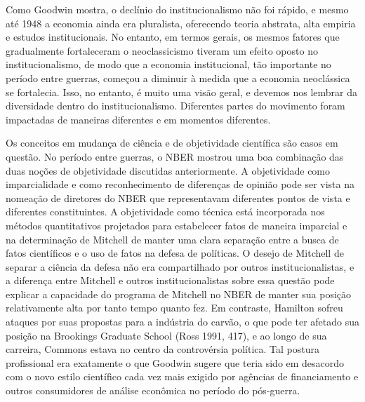 \documentclass[12pt]{article}
\begin{document}
Como Goodwin mostra, o declínio do institucionalismo não foi rápido, e mesmo até 1948 a economia ainda era pluralista, oferecendo teoria abstrata, alta empiria e estudos institucionais. No entanto, em termos gerais, os mesmos fatores que gradualmente fortaleceram o neoclassicismo tiveram um efeito oposto no institucionalismo, de modo que a economia institucional, tão importante no período entre guerras, começou a diminuir à medida que a economia neoclássica se fortalecia. Isso, no entanto, é muito uma visão geral, e devemos nos lembrar da diversidade dentro do institucionalismo. Diferentes partes do movimento foram impactadas de maneiras diferentes e em momentos diferentes.

Os conceitos em mudança de ciência e de objetividade científica são casos em questão. No período entre guerras, o NBER mostrou uma boa combinação das duas noções de objetividade discutidas anteriormente. A objetividade como imparcialidade e como reconhecimento de diferenças de opinião pode ser vista na nomeação de diretores do NBER que representavam diferentes pontos de vista e diferentes constituintes. A objetividade como técnica está incorporada nos métodos quantitativos projetados para estabelecer fatos de maneira imparcial e na determinação de Mitchell de manter uma clara separação entre a busca de fatos científicos e o uso de fatos na defesa de políticas. O desejo de Mitchell de separar a ciência da defesa não era compartilhado por outros institucionalistas, e a diferença entre Mitchell e outros institucionalistas sobre essa questão pode explicar a capacidade do programa de Mitchell no NBER de manter sua posição relativamente alta por tanto tempo quanto fez. Em contraste, Hamilton sofreu ataques por suas propostas para a indústria do carvão, o que pode ter afetado sua posição na Brookings Graduate School (Ross 1991, 417), e ao longo de sua carreira, Commons estava no centro da controvérsia política. Tal postura profissional era exatamente o que Goodwin sugere que teria sido em desacordo com o novo estilo científico cada vez mais exigido por agências de financiamento e outros consumidores de análise econômica no período do pós-guerra.
\end{document}
